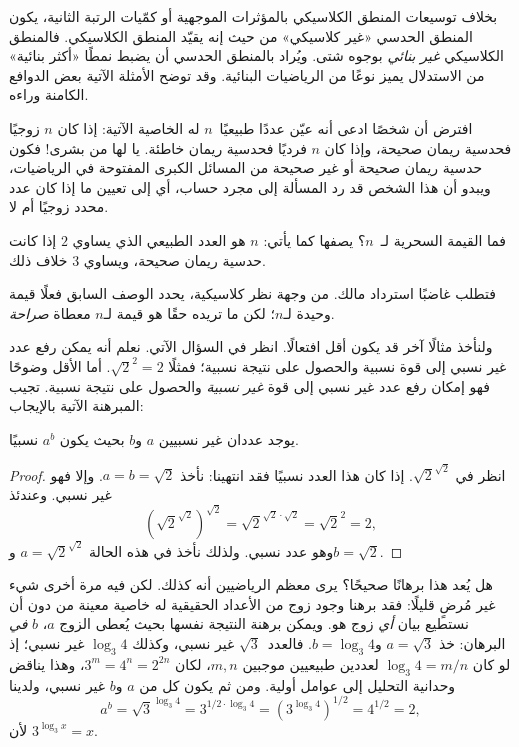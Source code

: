 \documentclass[../../../include/open-logic-section]{subfiles}
\begin{document}


بخلاف توسيعات المنطق الكلاسيكي بالمؤثرات الموجهية أو كمّيات الرتبة
الثانية، يكون المنطق الحدسي «غير كلاسيكي» من حيث إنه يقيّد المنطق
الكلاسيكي. فالمنطق الكلاسيكي \emph{غير بنائي} بوجوه شتى. ويُراد
بالمنطق الحدسي أن يضبط نمطًا «أكثر بنائية» من الاستدلال يميز نوعًا من
الرياضيات البنائية. وقد توضح الأمثلة الآتية بعض الدوافع الكامنة وراءه.

افترض أن شخصًا ادعى أنه عيّن عددًا طبيعيًا~$n$ له الخاصية الآتية: إذا
كان $n$ زوجيًا فحدسية ريمان صحيحة، وإذا كان $n$ فرديًا فحدسية ريمان
خاطئة. يا لها من بشرى!{} فكون حدسية ريمان صحيحة أو غير صحيحة من
المسائل الكبرى المفتوحة في الرياضيات، ويبدو أن هذا الشخص قد رد
المسألة إلى مجرد حساب، أي إلى تعيين ما إذا كان عدد محدد زوجيًا أم لا.

فما القيمة السحرية لـ~$n$؟ يصفها كما يأتي: $n$ هو العدد الطبيعي الذي
يساوي $2$ إذا كانت حدسية ريمان صحيحة، ويساوي $3$ خلاف ذلك.

فتطلب غاضبًا استرداد مالك. من وجهة نظر كلاسيكية، يحدد الوصف السابق
فعلًا قيمة وحيدة لـ$n$؛ لكن ما تريده حقًا هو قيمة لـ$n$ معطاة
\emph{صراحة}.

ولنأخذ مثالًا آخر قد يكون أقل افتعالًا. انظر في السؤال الآتي. نعلم أنه
يمكن رفع عدد غير نسبي إلى قوة نسبية والحصول على نتيجة نسبية؛ فمثلًا
$\sqrt{2}^2 = 2$. أما الأقل وضوحًا فهو إمكان رفع عدد غير نسبي إلى قوة
\emph{غير نسبية} والحصول على نتيجة نسبية. تجيب المبرهنة الآتية
بالإيجاب:

\begin{thm}
يوجد عددان غير نسبيين $a$ و$b$ بحيث يكون $a^b$ نسبيًا.
\end{thm}

\begin{proof}
انظر في $\sqrt{2}^{\sqrt{2}}$. إذا كان هذا العدد نسبيًا فقد انتهينا:
نأخذ $a = b = \sqrt{2}$. وإلا فهو غير نسبي. وعندئذ
\[
(\sqrt{2}^{\sqrt{2}})^{\sqrt{2}} = \sqrt{2}^{\sqrt{2} \cdot
  \sqrt{2}} = \sqrt{2}^2 = 2,
\]
وهو عدد نسبي. ولذلك نأخذ في هذه الحالة
$a=\sqrt{2}^{\sqrt{2}}$ و$b=\sqrt 2$.
\end{proof}

هل يُعد هذا برهانًا صحيحًا؟ يرى معظم الرياضيين أنه كذلك. لكن فيه مرة
أخرى شيء غير مُرضٍ قليلًا: فقد برهنا وجود زوج من الأعداد الحقيقية له
خاصية معينة من دون أن نستطيع بيان \emph{أي} زوج هو. ويمكن برهنة
النتيجة نفسها بحيث يُعطى الزوج $a$، $b$ \emph{في} البرهان: خذ
$a = \sqrt{3}$ و$b = \log_3 4$. فالعدد~$\sqrt3$ غير نسبي، وكذلك
$\log_3 4$ غير نسبي؛ إذ لو كان $\log_3 4=m/n$ لعددين طبيعيين موجبين
$m,n$، لكان $3^m=4^n=2^{2n}$، وهذا يناقض وحدانية التحليل إلى عوامل
أولية. ومن ثم يكون كل من $a$ و$b$ غير نسبي، ولدينا
\[
a^b = \sqrt{3}^{\log_3 4} = 3^{1/2 \cdot \log_3 4} = (3^{\log_3
  4})^{1/2} = 4^{1/2}= 2,
\]
لأن $3^{\log_3 x} = x$.
\end{document}
